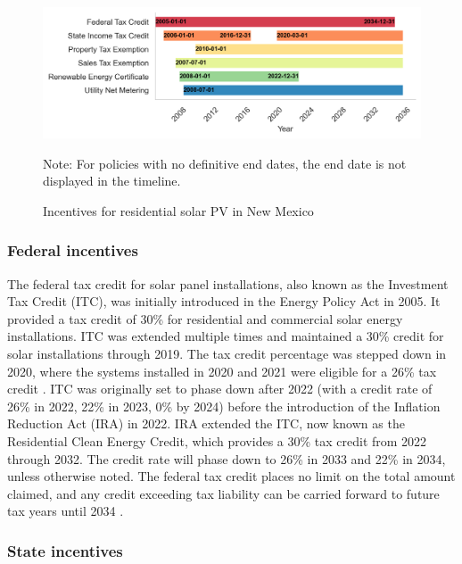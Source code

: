 \documentclass[11pt,twoside,letterpaper]{article}
\begin{document}
\begin{figure}[H]
    \centering
    \includegraphics[width=1\textwidth]{figures/policy_timeline.png}
    \caption{Incentives for residential solar PV in New Mexico}
    \label{fig:nm_incentive}
    \begin{flushleft}
        \footnotesize Note: For policies with no definitive end dates, the end date is not displayed in the timeline.
    \end{flushleft}
\end{figure}

\subsubsection{Federal incentives}


The federal tax credit for solar panel installations, also known as the Investment Tax Credit (ITC), was initially introduced in the Energy Policy Act in 2005. It provided a tax credit of 30\% for residential and commercial solar energy installations. ITC was extended multiple times and maintained a 30\% credit for solar installations through 2019. The tax credit percentage was stepped down in 2020, where the systems installed in 2020 and 2021 were eligible for a 26\% tax credit \parencite{doeitc}. ITC was originally set to phase down after 2022 (with a credit rate of 26\% in 2022, 22\% in 2023, 0\% by 2024) before the introduction of the Inflation Reduction Act (IRA) in 2022. IRA extended the ITC, now known as the Residential Clean Energy Credit, which provides a 30\% tax credit from 2022 through 2032. The credit rate will phase down to 26\% in 2033 and 22\% in 2034, unless otherwise noted. The federal tax credit places no limit on the total amount claimed, and any credit exceeding tax liability can be carried forward to future tax years until 2034 \parencite{irs}.

\subsubsection{State incentives}
\end{document}
